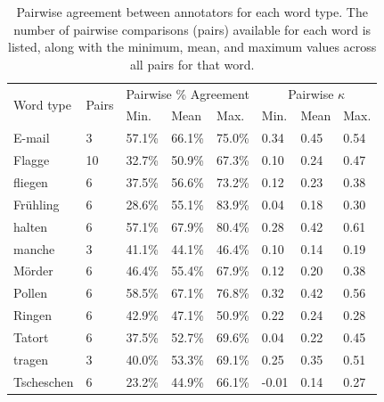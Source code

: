 		\begin{table}%
			\centering
			\caption[Pairwise agreement statistics by word type]{Pairwise agreement between annotators for each word type.  The number of pairwise comparisons (pairs) available for each word is listed, along with the minimum, mean, and maximum values across all pairs for that word.}
			
			\begin{tabularx}{\textwidth}{lXXXXXXX}			
			\toprule		

\multirow{2}{*}{Word type}	&	\multirow{2}{*}{Pairs}	&	\multicolumn{3}{c}{Pairwise \% Agreement}					&	\multicolumn{3}{c}{Pairwise $\kappa$}					\\
				\cmidrule(lr){3-5}						\cmidrule(lr){6-8}					
	&		&	Min.	&	Mean	&	Max.	&	Min.	&	Mean	&	Max.	\\
\midrule															
E-mail	&	3	&	57.1\%	&	66.1\%	&	75.0\%	&	0.34	&	0.45	&	0.54	\\
Flagge	&	10	&	32.7\%	&	50.9\%	&	67.3\%	&	0.10	&	0.24	&	0.47	\\
fliegen	&	6	&	37.5\%	&	56.6\%	&	73.2\%	&	0.12	&	0.23	&	0.38	\\
Frühling	&	6	&	28.6\%	&	55.1\%	&	83.9\%	&	0.04	&	0.18	&	0.30	\\
halten	&	6	&	57.1\%	&	67.9\%	&	80.4\%	&	0.28	&	0.42	&	0.61	\\
manche	&	3	&	41.1\%	&	44.1\%	&	46.4\%	&	0.10	&	0.14	&	0.19	\\
Mörder	&	6	&	46.4\%	&	55.4\%	&	67.9\%	&	0.12	&	0.20	&	0.38	\\
Pollen	&	6	&	58.5\%	&	67.1\%	&	76.8\%	&	0.32	&	0.42	&	0.56	\\
Ringen	&	6	&	42.9\%	&	47.1\%	&	50.9\%	&	0.22	&	0.24	&	0.28	\\
Tatort	&	6	&	37.5\%	&	52.7\%	&	69.6\%	&	0.04	&	0.22	&	0.45	\\
tragen	&	3	&	40.0\%	&	53.3\%	&	69.1\%	&	0.25	&	0.35	&	0.51	\\
Tscheschen	&	6	&	23.2\%	&	44.9\%	&	66.1\%	&	-0.01	&	0.14	&	0.27	\\		

			\bottomrule
			\end{tabularx}
			
			\label{tab:agreement:words}
		\end{table}
		
